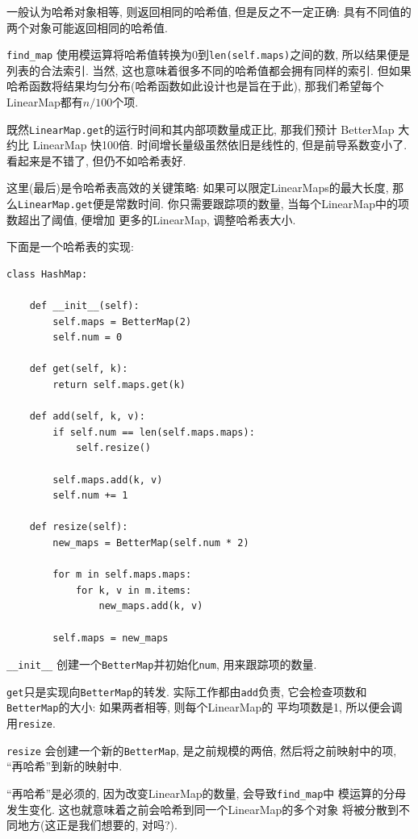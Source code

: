 \documentclass[10pt]{book}
\begin{document}
一般认为哈希对象相等, 则返回相同的哈希值,
但是反之不一定正确: 具有不同值的两个对象可能返回相同的哈希值.

\verb"find_map" 使用模运算将哈希值转换为0到{\tt len(self.maps)}之间的数, 
所以结果便是列表的合法索引.
当然, 这也意味着很多不同的哈希值都会拥有同样的索引. 
但如果哈希函数将结果均匀分布(哈希函数如此设计也是旨在于此), 
那我们希望每个LinearMap都有$n/100$个项. 

既然{\tt LinearMap.get}的运行时间和其内部项数量成正比, 
那我们预计 BetterMap 大约比 LinearMap 快100倍. 
时间增长量级虽然依旧是线性的, 但是前导系数变小了. 
看起来是不错了, 但仍不如哈希表好. 

这里(最后)是令哈希表高效的关键策略:
如果可以限定LinearMaps的最大长度, 那么{\tt LinearMap.get}便是常数时间.
你只需要跟踪项的数量, 当每个LinearMap中的项数超出了阈值, 便增加
更多的LinearMap, 调整哈希表大小. 

下面是一个哈希表的实现:

\begin{verbatim}
class HashMap:

    def __init__(self):
        self.maps = BetterMap(2)
        self.num = 0

    def get(self, k):
        return self.maps.get(k)

    def add(self, k, v):
        if self.num == len(self.maps.maps):
            self.resize()

        self.maps.add(k, v)
        self.num += 1

    def resize(self):
        new_maps = BetterMap(self.num * 2)

        for m in self.maps.maps:
            for k, v in m.items:
                new_maps.add(k, v)

        self.maps = new_maps
\end{verbatim}

\verb"__init__" 创建一个{\tt BetterMap}并初始化{\tt num}, 用来跟踪项的数量. 

{\tt get}只是实现向{\tt BetterMap}的转发. 实际工作都由{\tt add}负责,
它会检查项数和{\tt BetterMap}的大小: 如果两者相等, 则每个LinearMap的
平均项数是1, 所以便会调用{\tt resize}.


{\tt resize} 会创建一个新的{\tt BetterMap}, 是之前规模的两倍, 
然后将之前映射中的项, ``再哈希''到新的映射中.

``再哈希''是必须的, 因为改变LinearMap的数量, 会导致\verb"find_map"中
模运算的分母发生变化. 这也就意味着之前会哈希到同一个LinearMap的多个对象
将被分散到不同地方(这正是我们想要的, 对吗?).
\end{document}
